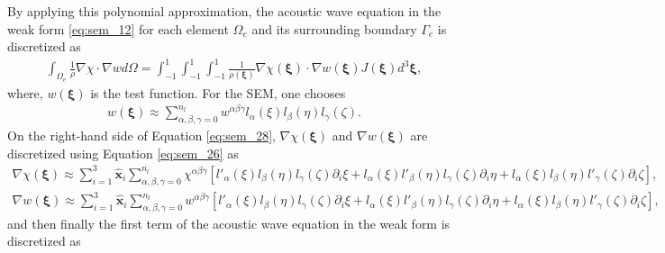             By applying this polynomial approximation, the acoustic wave equation in the weak form \ref{eq:sem_12} for each element $\Omega_e$ and its
surrounding boundary $\Gamma_e$ is discretized as
            \begin{align} \label{eq:sem_28}
                \int_{\Omega_e}\frac{1}{\rho}\nabla\chi\cdot\nabla wd\Omega =
                \int_{-1}^1\int_{-1}^1\int_{-1}^1 \frac{1}{\rho(\bm{\xi})}\nabla\chi(\bm{\xi})\cdot \nabla w(\bm{\xi})J(\bm{\xi})d^3 \bm{\xi},
            \end{align}
            where, $w(\bm{\xi})$ is the test function. For the SEM, one chooses
            \begin{align} \label{eq:sem_29}
                w(\bm{\xi})\approx \sum_{\alpha,\beta,\gamma = 0}^{n_l} w^{\alpha\beta\gamma}l_\alpha(\xi)l_\beta(\eta)l_\gamma(\zeta).
            \end{align}
            On the right-hand side of Equation \ref{eq:sem_28}, $\nabla\chi(\bm{\xi})$ and $\nabla w(\bm{\xi})$ are discretized using Equation \ref{eq:sem_26} as
            \begin{align} \label{eq:sem_30}
                \nabla\chi(\bm{\xi}) \approx \sum_{i=1}^3 \hat{\bm{x}}_i \sum_{\alpha,\beta,\gamma=0}^{n_l} \chi^{\alpha\beta\gamma}[
                    l'_\alpha(\xi)l_\beta(\eta)l_\gamma(\zeta)\partial_i\xi
                   +l_\alpha(\xi)l'_\beta(\eta)l_\gamma(\zeta)\partial_i\eta
                   +l_\alpha(\xi)l_\beta(\eta)l'_\gamma(\zeta)\partial_i\zeta],
            \end{align}
            \begin{align} \label{eq:sem_31}
                \nabla w(\bm{\xi}) \approx \sum_{i=1}^3 \hat{\bm{x}}_i \sum_{\alpha,\beta,\gamma=0}^{n_l} w^{\alpha\beta\gamma}[
                    l'_\alpha(\xi)l_\beta(\eta)l_\gamma(\zeta)\partial_i\xi
                   +l_\alpha(\xi)l'_\beta(\eta)l_\gamma(\zeta)\partial_i\eta
                   +l_\alpha(\xi)l_\beta(\eta)l'_\gamma(\zeta)\partial_i\zeta],
            \end{align}
            and then finally the first term of the acoustic wave equation in the weak form is discretized as
